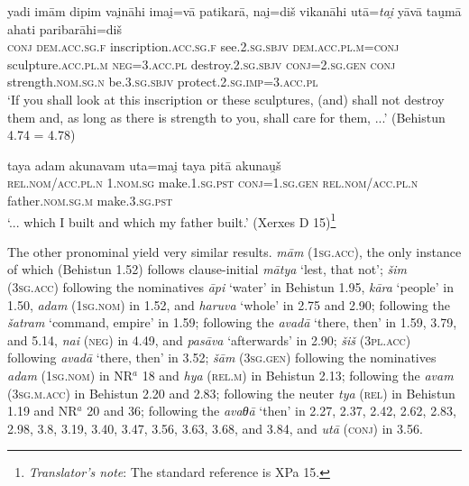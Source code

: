 \begin{exe}
\ex
\gll yadi imām dipim vai̯nāhi imai̯=vā patikarā, nai̯=diš vikanāhi utā=\emph{tai̯} yāvā tau̯mā ahati paribarāhi=diš\\
\textsc{conj} \textsc{dem.acc.sg.f} inscription.\textsc{acc.sg.f} see.\textsc{2.sg.sbjv} \textsc{dem.acc.pl.m}=\textsc{conj} sculpture.\textsc{acc.pl.m} \textsc{neg}=\textsc{3.acc.pl} destroy.\textsc{2.sg.sbjv} \textsc{conj}=\textsc{2.sg.gen} \textsc{conj} strength.\textsc{nom.sg.n} be.\textsc{3.sg.sbjv} protect.\textsc{2.sg.imp}=\textsc{3.acc.pl}\\
\trans `If you shall look at this inscription or these sculptures, (and) shall not destroy them and, as long as there is strength to you, shall care for them, ...' (Behistun 4.74 = 4.78)
\label{behistun474}
\end{exe}

\begin{exe}
\ex
\gll taya adam akunavam uta=mai̯ taya pitā akunau̯š\\
\textsc{rel.nom/acc.pl.n} \textsc{1.nom.sg} make.\textsc{1.sg.pst} \textsc{conj}=\textsc{1.sg.gen} \textsc{rel.nom/acc.pl.n} father.\textsc{nom.sg.m} make.\textsc{3.sg.pst}\\
\trans `... which I built and which my father built.' (Xerxes D 15)\footnote{\emph{Translator's note}: The standard reference is XPa 15.}
\label{xerxesd15}
\end{exe}

The other pronominal  yield very similar results.  \emph{mām} (\textsc{1sg.acc}), the only instance of which (Behistun 1.52) follows clause-initial \emph{mātya} `lest, that not'; \emph{šim} (\textsc{3sg.acc}) following the nominatives \emph{āpi} `water' in Behistun 1.95, \emph{kāra} `people' in 1.50, \emph{adam} (\textsc{1sg.nom}) in 1.52, and \emph{haruva} `whole' in 2.75 and 2.90; following the  \emph{šatram} `command, empire' in 1.59; following the  \emph{avadā} `there, then' in 1.59, 3.79, and 5.14, \emph{nai} (\textsc{neg}) in 4.49, and \emph{pasāva} `afterwards' in 2.90; \emph{šiš} (\textsc{3pl.acc}) following \emph{avadā} `there, then' in 3.52; \emph{šām} (\textsc{3sg.gen}) following the nominatives \emph{adam} (\textsc{1sg.nom}) in NR$^a$ 18 and \emph{hya} (\textsc{rel.m}) in Behistun 2.13; following the  \emph{avam} (\textsc{3sg.m.acc}) in Behistun 2.20 and 2.83; following the neuter \emph{tya} (\textsc{rel}) in Behistun 1.19 and NR$^a$ 20 and 36; following the  \emph{avaθā} `then' in 2.27, 2.37, 2.42, 2.62, 2.83, 2.98, 3.8, 3.19, 3.40, 3.47, 3.56, 3.63, 3.68, and 3.84, and \emph{utā} (\textsc{conj}) in 3.56.

